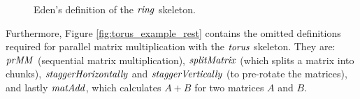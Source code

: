 \documentclass[paper=A4,twoside=true,openright,parskip=full,chapterprefix=true,headings=normal,bibliography=totoc,listof=totoc,titlepage=on,captions=tableabove,draft=false,british]{scrreprt}%
\begin{document}
\begin{figure}[t]
\resethooks
\caption{Eden's definition of the \ensuremath{\Varid{ring}} skeleton.}\label{fig:ringEden}\end{figure}

Furthermore, Figure \ref{fig:torus_example_rest} contains the omitted
definitions required for parallel matrix multiplication with the \ensuremath{\Varid{torus}}
skeleton. They are: \ensuremath{\Varid{prMM}} (sequential matrix multiplication),
\ensuremath{\Varid{splitMatrix}} (which splits a matrix into chunks), \ensuremath{\Varid{staggerHorizontally}}
and \ensuremath{\Varid{staggerVertically}} (to pre-rotate the matrices), and lastly
\ensuremath{\Varid{matAdd}}, which calculates \(A + B\) for two matrices \(A\) and \(B\).
\end{document}
